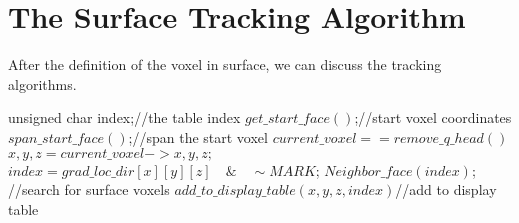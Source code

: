 \documentclass{article}
\begin{document}
\section{The Surface Tracking Algorithm}
After the definition of the voxel in surface, we can discuss the tracking
algorithms.

\begin{codebox}
  \li unsigned char index;\qquad //the table index
  \li $get\_start\_face()$;\qquad //start voxel coordinates
  \li $span\_start\_face()$;\qquad //span the start voxel
  \li \While $current\_voxel == remove\_q\_head()$
  \li \Do
  \li $x,y,z = current\_voxel->x,y,z;$
  \li $index = grad\_loc\_dir[x][y][z] \quad \& \quad \sim MARK$;
  \li $Neighbor\_face(index)$; \qquad //search for surface voxels
  \li $add\_to\_display\_table(x,y,z,index)$\qquad //add to display table
  \End
\end{codebox}
\end{document}
